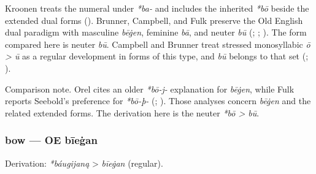\documentclass[
  british,
  a4paper,
]{article}
\begin{document}
Kroonen treats the numeral under \emph{*ba-} and includes the inherited
\emph{*bō} beside the extended dual forms
(). Brunner, Campbell, and
Fulk preserve the Old English dual paradigm with masculine \emph{bēġen},
feminine \emph{bā}, and neuter \emph{bū}
(;
;
). The form compared here is
neuter \emph{bū}. Campbell and Brunner treat stressed monosyllabic
\emph{ō \textgreater{} ū} as a regular development in forms of this
type, and \emph{bū} belongs to that set
(;
).

Comparison note. Orel cites an older \emph{*bō-j-} explanation for
\emph{bēġen}, while Fulk reports Seebold's preference for \emph{*bō-þ-}
(; ). Those analyses concern \emph{bēġen} and the related
extended forms. The derivation here is the neuter \emph{*bō
\textgreater{} bū}.

\subsubsection{bow --- OE bīeġan}\label{bow-oe-bux12beux121an}

Derivation: \emph{*báugijaną} \textgreater{} \emph{bīeġan} (regular).

\begingroup
\setlength{\fboxsep}{6pt}
\end{document}

